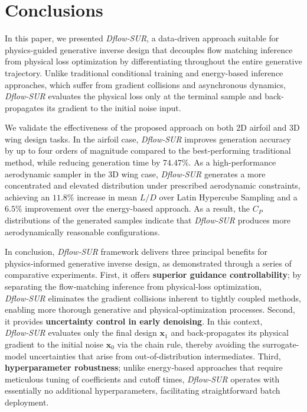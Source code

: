 \section{Conclusions}
\label{ch7:sect:conculsion}
In this paper, we presented \textit{Dflow‑SUR}, a data-driven approach suitable for physics-guided generative inverse design that decouples flow matching inference from physical loss optimization by differentiating throughout the entire generative trajectory. Unlike traditional conditional training and energy-based inference approaches, which suffer from gradient collisions and asynchronous dynamics, \textit{Dflow‑SUR} evaluates the physical loss only at the terminal sample and back-propagates its gradient to the initial noise input. 

We validate the effectiveness of the proposed approach on both 2D airfoil and 3D wing design tasks. In the airfoil case, \textit{Dflow‑SUR} improves generation accuracy by up to four orders of magnitude compared to the best-performing traditional method, while reducing generation time by $74.47\%$. As a high-performance aerodynamic sampler in the 3D wing case, \textit{Dflow‑SUR} generates a more concentrated and elevated distribution under prescribed aerodynamic constraints, achieving an $11.8\%$ increase in mean $L/D$ over Latin Hypercube Sampling and a $6.5\%$ improvement over the energy-based approach. As a result, the $C_P$ distributions of the generated samples indicate that \textit{Dflow‑SUR} produces more aerodynamically reasonable configurations.

In conclusion, \textit{Dflow‑SUR} framework delivers three principal benefits for physics‑informed generative inverse design, as demonstrated through a series of comparative experiments. First, it offers \textbf{superior guidance controllability}; by separating the flow‑matching inference from physical‑loss optimization, \textit{Dflow‑SUR} eliminates the gradient collisions inherent to tightly coupled methods, enabling more thorough generative and physical‑optimization processes. Second, it provides \textbf{uncertainty control in early denoising}. In this context, \textit{Dflow‑SUR} evaluates only the final design $\mathbf{x}_1$ and back‑propagates its physical gradient to the initial noise $\mathbf{x}_0$ via the chain rule, thereby avoiding the surrogate-model uncertainties that arise from out-of-distribution intermediates. Third, \textbf{hyperparameter robustness}; unlike energy‑based approaches that require meticulous tuning of coefficients and cutoff times, \textit{Dflow‑SUR} operates with essentially no additional hyperparameters, facilitating straightforward batch deployment.

